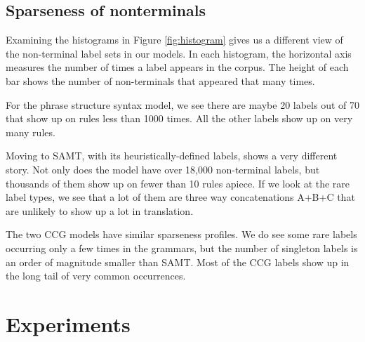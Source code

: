 \documentclass[a4paper]{article}
\begin{document}



\subsection{Sparseness of nonterminals}

Examining the histograms in Figure \ref{fig:histogram} gives us a different view of the non-terminal label sets in our models. In each histogram, the horizontal axis measures the number of times a label appears in the corpus. The height of each bar shows the number of non-terminals that appeared that many times. %

For the phrase structure syntax model, we see there are maybe 20 labels out of 70 that show up on rules less than 1000 times. All the other labels show up on very many rules.

Moving to SAMT, with its heuristically-defined labels, shows a very different story. Not only does the model have over 18,000 non-terminal labels, but thousands of them show up on fewer than 10 rules apiece. If we look at the rare label types, we see that a lot of them are three way concatenations A+B+C that are unlikely to show up a lot in translation. 

The two CCG models have similar sparseness profiles. We do see some rare labels occurring only a few times in the grammars, but the number of singleton labels is an order of magnitude smaller than SAMT. Most of the CCG labels show up in the long tail of very common occurrences.

\section{Experiments}
\end{document}
